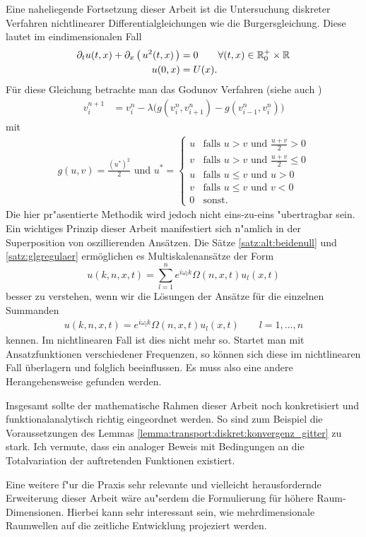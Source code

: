 
Eine naheliegende Fortsetzung dieser Arbeit ist die Untersuchung diskreter Verfahren nichtlinearer Differentialgleichungen wie die Burgersgleichung.
Diese lautet im eindimensionalen Fall
\begin{align}
\begin{split}
\partial_t u(t,x) + \partial_x \left( \, u^2(t,x) \,\right) &= 0 \qquad \forall (t,x) \in \mathbb R^+_0 \times \mathbb R\\
u(0,x) &= U(x).
\end{split}
\end{align}
Für diese Gleichung betrachte man das Godunov Verfahren (siehe auch \cite{leveque2002finite})
\begin{align}
v^{n+1}_i &= v^n_i - \lambda \bigl( g(v^n_i, v^n_{i+1}) - g(v^n_{i-1}, v^n_i) \bigr)
\end{align}
mit
\begin{align}
g(u,v) = \frac{\left(u^*\right)^2}2 \text{ und } u^* =
\begin{cases}
u & \text{falls $u > v$ und $\frac {u+v}2 > 0$}\\
v & \text{falls $u > v$ und $\frac {u+v}2 \leq 0$}\\
u & \text{falls $u \leq v$ und $u > 0$}\\
v & \text{falls $u \leq v$ und $v < 0$}\\
0 & \text{sonst.}
\end{cases}
\end{align}
Die hier pr"asentierte Methodik wird jedoch nicht eins-zu-eins "ubertragbar sein.
Ein wichtiges Prinzip dieser Arbeit manifestiert sich n"amlich in der Superposition von oszillierenden Ansätzen.
Die Sätze \ref{satz:alt:beidenull} und \ref{satz:glgregulaer} ermöglichen es Multiskalenansätze der Form
\[ u(k,n,x,t) = \sum_{l=1}^n e^{i \omega_l k} \Omega(n,x,t) u_l(x,t) \]
besser zu verstehen, wenn wir die Lösungen der Ansätze für die einzelnen Summanden
\begin{align}\label{burgers:1}
u(k,n,x,t) = e^{i \omega_l k} \Omega(n,x,t) u_l(x,t) \qquad l = 1, \ldots, n
\end{align}
kennen.
Im nichtlinearen Fall ist dies nicht mehr so.
Startet man mit Ansatzfunktionen verschiedener Frequenzen, so können sich diese im nichtlinearen Fall überlagern und folglich beeinflussen.
Es muss also eine andere Herangehensweise gefunden werden.

Insgesamt sollte der mathematische Rahmen dieser Arbeit noch konkretisiert und funktionalanalytisch richtig eingeordnet werden.
So sind zum Beispiel die Voraussetzungen des Lemmas \ref{lemma:transport:diskret:konvergenz_gitter} zu stark.
Ich vermute, dass ein analoger Beweis mit Bedingungen an die Totalvariation der auftretenden Funktionen existiert.

Eine weitere f"ur die Praxis sehr relevante und vielleicht herausfordernde Erweiterung dieser Arbeit wäre au"serdem die Formulierung für höhere Raum-Dimensionen.
Hierbei kann sehr interessant sein, wie mehrdimensionale Raumwellen auf die zeitliche Entwicklung projeziert werden.